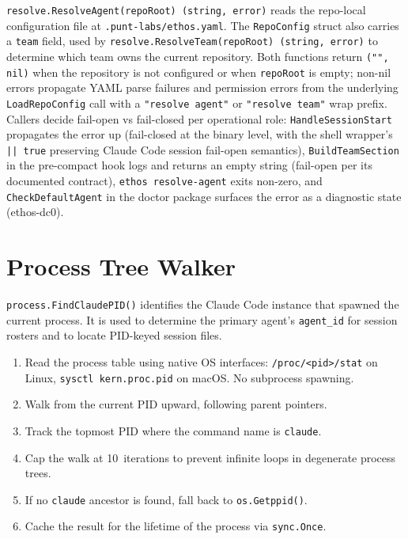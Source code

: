 \documentclass[a4paper,10pt]{article}
\newcommand{\field}[1]{\texttt{#1}}
\newcommand{\cmd}[1]{\texttt{#1}}
\newcommand{\fpath}[1]{\texttt{#1}}
\begin{document}
\texttt{resolve.ResolveAgent(repoRoot) (string, error)} reads the
repo-local configuration file at \fpath{.punt-labs/ethos.yaml}.
The \texttt{RepoConfig} struct also carries a \field{team} field,
used by \texttt{resolve.ResolveTeam(repoRoot) (string, error)} to
determine which team owns the current repository.  Both functions
return \texttt{("", nil)} when the repository is not configured or
when \texttt{repoRoot} is empty; non-nil errors propagate YAML
parse failures and permission errors from the underlying
\texttt{LoadRepoConfig} call with a \texttt{"resolve agent"} or
\texttt{"resolve team"} wrap prefix.  Callers decide fail-open vs
fail-closed per operational role: \texttt{HandleSessionStart}
propagates the error up (fail-closed at the binary level, with
the shell wrapper's \texttt{|| true} preserving Claude Code
session fail-open semantics), \texttt{BuildTeamSection} in the
pre-compact hook logs and returns an empty string (fail-open per
its documented contract), \cmd{ethos resolve-agent} exits
non-zero, and \texttt{CheckDefaultAgent} in the doctor package
surfaces the error as a diagnostic state (ethos-dc0).

\section{Process Tree Walker}

\texttt{process.FindClaudePID()} identifies the Claude Code instance
that spawned the current process.  It is used to determine the
primary agent's \field{agent\_id} for session rosters and to locate
PID-keyed session files.

\begin{enumerate}
  \item Read the process table using native OS interfaces:
    \texttt{/proc/<pid>/stat} on Linux,
    \texttt{sysctl kern.proc.pid} on macOS.  No subprocess spawning.
  \item Walk from the current PID upward, following parent pointers.
  \item Track the topmost PID where the command name is
    \texttt{claude}.
  \item Cap the walk at 10~iterations to prevent infinite loops in
    degenerate process trees.
  \item If no \texttt{claude} ancestor is found, fall back to
    \texttt{os.Getppid()}.
  \item Cache the result for the lifetime of the process via
    \texttt{sync.Once}.
\end{enumerate}
\end{document}

